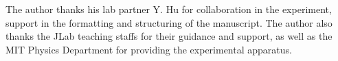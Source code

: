 \documentclass[aps,twocolumn,secnumarabic,balancelastpage,amsmath,amssymb,nofootinbib,floatfix]{revtex4-1}
\begin{document}
\begin{acknowledgments}

The author thanks his lab partner  Y. Hu for collaboration in the experiment, support in the formatting and structuring of the manuscript. The author also thanks the JLab teaching staffs for their guidance and support, as well as the MIT Physics Department for providing the experimental apparatus.

\end{acknowledgments}





\appendix
\end{document}
